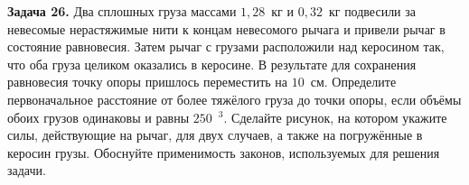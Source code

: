 \begin{taskbasic}[code={\label{task:statics_v14_n26}}]
\textbf{Задача 26.} Два сплошных груза массами $1{,}28$~кг и $0{,}32$~кг подвесили за невесомые нерастяжимые нити к концам невесомого рычага и привели рычаг в состояние равновесия. Затем рычаг с грузами расположили над керосином так, что оба груза целиком оказались в керосине. В результате для сохранения равновесия точку опоры пришлось переместить на $10$~см. Определите первоначальное расстояние от более тяжёлого груза до точки опоры, если объёмы обоих грузов одинаковы и равны $250$~$^3$. Сделайте рисунок, на котором укажите силы, действующие на рычаг, для двух случаев, а также на погружённые в керосин грузы. Обоснуйте применимость законов, используемых для решения задачи.

\end{taskbasic}

